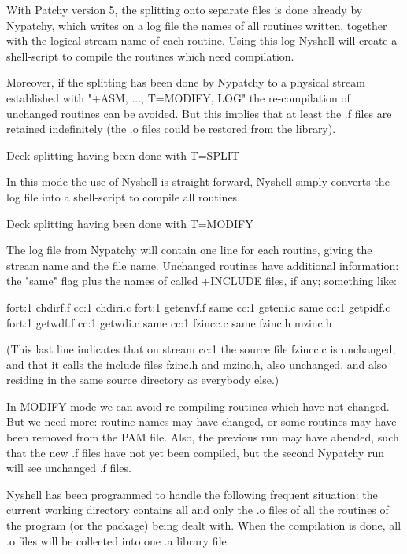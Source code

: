With Patchy version 5, the splitting onto separate files is done already
by Nypatchy, which writes on a log file the names of all routines written,
together with the logical stream name of each routine. Using this log
Nyshell will create a shell-script to compile the routines which need
compilation.

Moreover, if the splitting has been done by Nypatchy to a physical stream
established with "+ASM, ..., T=MODIFY, LOG" the re-compilation of unchanged
routines can be avoided. But this implies that at least the .f files are
retained indefinitely (the .o files could be restored from the library).


\item
Deck splitting having been done with T=SPLIT

In this mode the use of Nyshell is straight-forward, Nyshell simply
converts the log file into a shell-script to compile all routines.


\item
Deck splitting having been done with T=MODIFY

The log file from Nypatchy will contain one line for each routine,
giving the stream name and the file name. Unchanged routines have
additional information:  the "same" flag plus the names of called
+INCLUDE files, if any; something like:

      fort:1    chdirf.f
      cc:1      chdiri.c
      fort:1    getenvf.f  same
      cc:1      geteni.c   same
      cc:1      getpidf.c
      fort:1    getwdf.f
      cc:1      getwdi.c   same
      cc:1      fzincc.c   same   fzinc.h mzinc.h

(This last line indicates that on stream cc:1 the source file fzincc.c
is unchanged, and that it calls the include files fzinc.h and mzinc.h,
also unchanged, and also residing in the same source directory as
everybody else.)

In MODIFY mode we can avoid re-compiling routines which have not changed.
But we need more: routine names may have changed, or some routines may
have been removed from the PAM file. Also, the previous run may have
abended, such that the new .f files have not yet been compiled, but
the second Nypatchy run will see unchanged .f files.

Nyshell has been programmed to handle the following frequent situation:
the current working directory contains all and only the .o files of all
the routines of the program (or the package) being dealt with. When the
compilation is done, all .o files will be collected into one .a library file.

